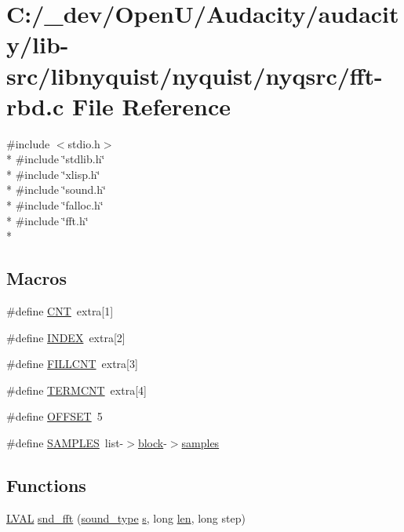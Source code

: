 \hypertarget{fft-rbd_8c}{}\section{C\+:/\+\_\+dev/\+Open\+U/\+Audacity/audacity/lib-\/src/libnyquist/nyquist/nyqsrc/fft-\/rbd.c File Reference}
\label{fft-rbd_8c}
{\ttfamily \#include $<$stdio.\+h$>$}\\*
{\ttfamily \#include \char`\"{}stdlib.\+h\char`\"{}}\\*
{\ttfamily \#include \char`\"{}xlisp.\+h\char`\"{}}\\*
{\ttfamily \#include \char`\"{}sound.\+h\char`\"{}}\\*
{\ttfamily \#include \char`\"{}falloc.\+h\char`\"{}}\\*
{\ttfamily \#include \char`\"{}fft.\+h\char`\"{}}\\*
\subsection*{Macros}
\begin{DoxyCompactItemize}
\item 
\#define \hyperlink{fft-rbd_8c_a6a4288add566c8d9c96f7cb0dc661c66}{C\+NT}~extra\mbox{[}1\mbox{]}
\item 
\#define \hyperlink{fft-rbd_8c_ac6885dbfb371c33e523c7fb046118b36}{I\+N\+D\+EX}~extra\mbox{[}2\mbox{]}
\item 
\#define \hyperlink{fft-rbd_8c_a37dfe203b33a1b857120715d29cd27fb}{F\+I\+L\+L\+C\+NT}~extra\mbox{[}3\mbox{]}
\item 
\#define \hyperlink{fft-rbd_8c_aab6fbf001c84b54391c733af2b9a457f}{T\+E\+R\+M\+C\+NT}~extra\mbox{[}4\mbox{]}
\item 
\#define \hyperlink{fft-rbd_8c_a21005f9f4e2ce7597c5eb4351816d7e2}{O\+F\+F\+S\+ET}~5
\item 
\#define \hyperlink{fft-rbd_8c_ad0c329adebc27917fc0a4f51079acf6a}{S\+A\+M\+P\+L\+ES}~list-\/$>$\hyperlink{structblock}{block}-\/$>$\hyperlink{test__w__saw8_8c_a54185623a5a093f671a73e5fba6197a1}{samples}
\end{DoxyCompactItemize}
\subsection*{Functions}
\begin{DoxyCompactItemize}
\item 
\hyperlink{xldmem_8h_a9a9ec6a5fbca2b40ed8d19faa799be8c}{L\+V\+AL} \hyperlink{fft-rbd_8c_a107e0e622e4d07f218cce7cdf3d02c13}{snd\+\_\+fft} (\hyperlink{sound_8h_a792cec4ed9d6d636d342d9365ba265ea}{sound\+\_\+type} \hyperlink{lib_2expat_8h_a755339d27872b13735c2cab829e47157}{s}, long \hyperlink{lib_2expat_8h_af86d325fecfc8f47b61fbf5a5146f582}{len}, long step)
\end{DoxyCompactItemize}


